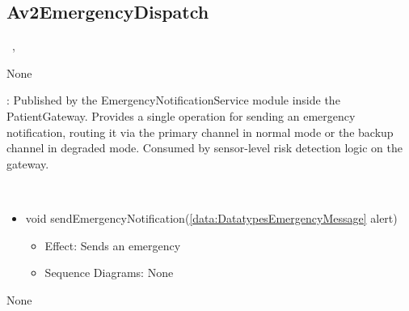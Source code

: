   \subsection{Av2EmergencyDispatch}\label{int:InterfacesAv2EmergencyDispatch}
    \begin{description}
      \item[Provided by:] \iconcomponent{}~, \iconcomponent{}~
      \item[Required by:] None 
           \item[Description]: Published by the EmergencyNotificationService module inside the PatientGateway. Provides a single operation for sending an emergency notification, routing it via the primary channel in normal mode or the backup channel in degraded mode. Consumed by sensor-level risk detection logic on the gateway.
      \item[Operations:] ~
    \begin{itemize}[noitemsep,nolistsep,leftmargin=-.25cm]
      \item \textsf{void sendEmergencyNotification(\ref{data:DatatypesEmergencyMessage} alert)}
        \begin{itemize}[noitemsep,nolistsep]
           \item Effect: Sends an emergency 
           \item Sequence Diagrams: None
        \end{itemize}
    \end{itemize}
      \item[Diagrams:] None
    \end{description}

